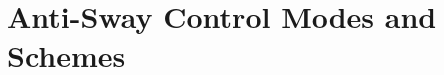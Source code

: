 \documentclass[letterpaper]{article}
\begin{document}

\newpage

\section{Anti-Sway Control Modes and Schemes}
\end{document}

